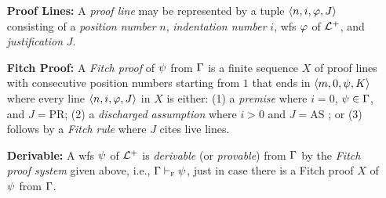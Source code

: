 \documentclass[a4paper, 11pt]{article} %
\begin{document}
\begin{enumerate}
  \item[\bf Proof Lines:] A \textit{proof line} may be represented by a tuple $\langle n,i,\varphi,J\rangle$ consisting of a \textit{position number} $n$, \textit{indentation number} $i$, wfs $\varphi$ of $\mathcal{L}^+$, and \textit{justification} $J$. %
  \item[\bf Fitch Proof:] A \textit{Fitch proof} of $\psi$ from $\Gamma$ is a finite sequence $X$ of proof lines with consecutive position numbers starting from $1$ that ends in $\langle m,0,\psi,K\rangle$ where every line $\langle n,i,\varphi,J\rangle$ in $X$ is either: (1) a \textit{premise} where $i = 0$, $\psi \in \Gamma$, and $J = \text{PR}$; (2) a \textit{discharged assumption} where $i > 0$ and $J = \text{AS}$ ; or (3) follows by a \textit{Fitch rule} where $J$ cites live lines.
  \item[\bf Derivable:]
    A wfs $\psi$ of $\mathcal{L}^+$ is \textit{derivable} (or \textit{provable}) from $\Gamma$ by the \textit{Fitch proof system} given above, i.e., $\Gamma \vdash_{\textsc{f}} \psi$, just in case there is a Fitch proof $X$ of $\psi$ from $\Gamma$.
\end{enumerate}
\end{document}
